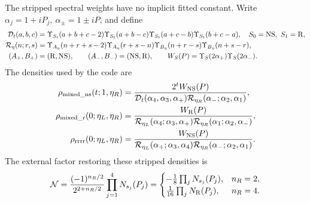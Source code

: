 \documentclass[11pt]{article}
\newcommand{\NS}{\mathrm{NS}}
\newcommand{\R}{\mathrm{R}}
\newcommand{\U}{\Upsilon}
\begin{document}
The stripped spectral weights have no implicit fitted constant.
Write \(\alpha_j=1+iP_j,\ \alpha_\pm=1\pm iP\), and define
\begin{align}
 {\cal D}_t(a,b,c)&=\U_{S_t}(a+b+c-2)
 \U_{S_t}(a+b-c)\U_{S_t}(a+c-b)\U_{S_t}(b+c-a),
 \quad S_0=\NS,\ S_1=\R,\\
 {\cal R}_\eta(n;r,s)&=\U_{A_\eta}(n+r+s-2)\U_{A_\eta}(r+s-n)
 \U_{B_\eta}(n+r-s)\U_{B_\eta}(n+s-r),\\
 (A_+,B_+)&=(\R,\NS),\qquad(A_-,B_-)=(\NS,\R),\qquad
 W_S(P)=\U_S(2\alpha_+)\U_S(2\alpha_-).
\end{align}
The densities used by the code are
\begin{align}
 \rho_{\rm mixed\_ns}(t;1,\eta_R)
 &=\frac{2^tW_\NS(P)}
 {{\cal D}_t(\alpha_4,\alpha_3,\alpha_+)
  {\cal R}_{\eta_R}(\alpha_-;\alpha_2,\alpha_1)},\\
 \rho_{\rm mixed\_r}(0;\eta_L,\eta_R)
 &=\frac{W_\R(P)}
 {{\cal R}_{\eta_L}(\alpha_4;\alpha_3,\alpha_+)
  {\cal R}_{\eta_R}(\alpha_1;\alpha_2,\alpha_-)},\\
 \rho_{\rm rrrr}(0;\eta_L,\eta_R)
 &=\frac{W_\NS(P)}
 {{\cal R}_{\eta_L}(\alpha_+;\alpha_3,\alpha_4)
  {\cal R}_{\eta_R}(\alpha_-;\alpha_2,\alpha_1)}.
 \label{eq:r-densities}
\end{align}
The external factor restoring these stripped densities is
\begin{equation}
 {\cal N}=\frac{(-1)^{n_R/2}}{2^{2+n_R/2}}
                   \prod_{j=1}^4N_{s_j}(P_j)
 =\begin{cases}-\frac18\prod_jN_{s_j}(P_j),&n_R=2,\\
                \frac1{16}\prod_jN_\R(P_j),&n_R=4.\end{cases}
 \label{eq:external-N}
\end{equation}
\end{document}
